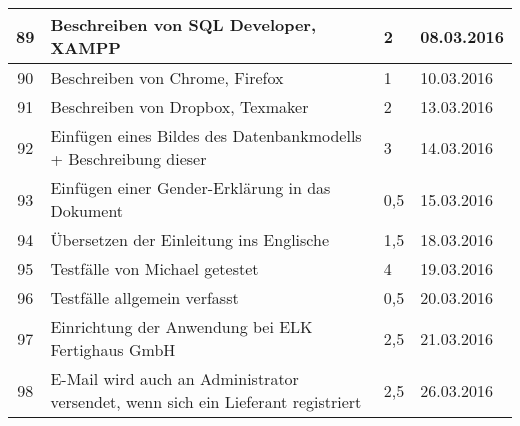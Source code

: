 \begin{longtable}[h]{| c | p{11.6cm} | l | l |}
89 & Beschreiben von SQL Developer, XAMPP & 2 & 08.03.2016 \\ \hline

90 & Beschreiben von Chrome, Firefox & 1 & 10.03.2016 \\ \hline

91 & Beschreiben von Dropbox, Texmaker & 2 & 13.03.2016 \\ \hline

92 & Einfügen eines Bildes des Datenbankmodells + Beschreibung dieser & 3 & 14.03.2016 \\ \hline

93 & Einfügen einer Gender-Erklärung in das Dokument & 0,5 & 15.03.2016 \\ \hline

94 & Übersetzen der Einleitung ins Englische & 1,5 & 18.03.2016 \\ \hline

95 & Testfälle von Michael getestet & 4 & 19.03.2016 \\ \hline

96 & Testfälle allgemein verfasst & 0,5 & 20.03.2016 \\ \hline

97 & Einrichtung der Anwendung bei ELK Fertighaus GmbH & 2,5 & 21.03.2016 \\ \hline

98 & E-Mail wird auch an Administrator versendet, wenn sich ein Lieferant registriert & 2,5 & 26.03.2016 \\ \hline

\end{longtable}
